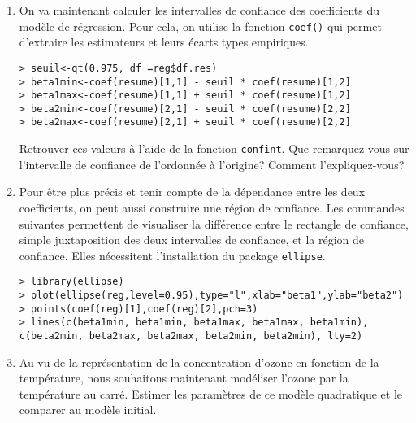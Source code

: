 \documentclass{td_um}
\providecommand{\1}{\mathds{1}}
\begin{document}
\begin{enumerate}
\item On va maintenant calculer les intervalles de confiance des coefficients du modèle de régression. Pour cela, on utilise la fonction \texttt{coef()} qui permet d'extraire les estimateurs et leurs écarts types empiriques.
\begin{verbatim}
> seuil<-qt(0.975, df =reg$df.res)
> beta1min<-coef(resume)[1,1] - seuil * coef(resume)[1,2]
> beta1max<-coef(resume)[1,1] + seuil * coef(resume)[1,2]
> beta2min<-coef(resume)[2,1] - seuil * coef(resume)[2,2]
> beta2max<-coef(resume)[2,1] + seuil * coef(resume)[2,2]
\end{verbatim}
Retrouver ces valeurs à l'aide de la fonction \texttt{confint}. Que remarquez-vous sur l'intervalle de confiance de l'ordonnée à l'origine? Comment l'expliquez-vous?
\item Pour être plus précis et tenir compte de la dépendance entre les deux coefficients, on peut aussi construire une région de confiance. Les commandes suivantes permettent de visualiser la différence entre le rectangle de confiance, simple juxtaposition des deux intervalles de confiance, et la région de confiance. Elles nécessitent l'installation du package \texttt{ellipse}.
    \begin{verbatim}
> library(ellipse)
> plot(ellipse(reg,level=0.95),type="l",xlab="beta1",ylab="beta2")
> points(coef(reg)[1],coef(reg)[2],pch=3)
> lines(c(beta1min, beta1min, beta1max, beta1max, beta1min), c(beta2min, beta2max, beta2max, beta2min, beta2min), lty=2)
\end{verbatim}
\item Au vu de la représentation de la concentration d'ozone en fonction de la température, nous souhaitons maintenant modéliser l'ozone par la température au carré. Estimer les paramètres de ce modèle quadratique et le comparer au modèle initial.
\end{enumerate}

\end{document}
